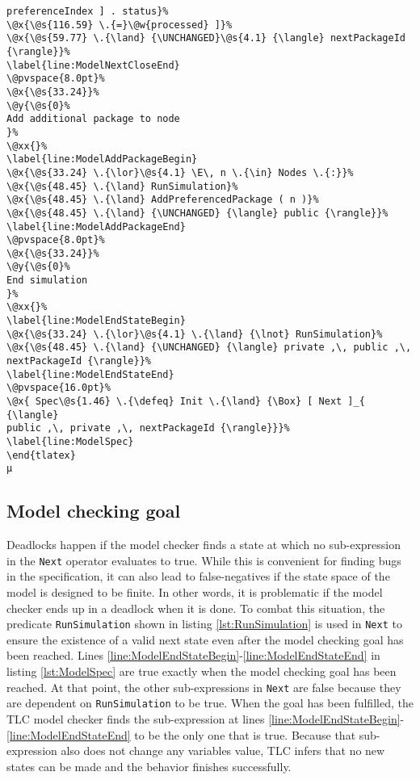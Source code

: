 \begin{lstlisting}[caption=System actor behavior in TLA\textsuperscript+ specification
    , label=lst:ModelSpec]
preferenceIndex ] . status}%
\@x{\@s{116.59} \.{=}\@w{processed} ]}%
\@x{\@s{59.77} \.{\land} {\UNCHANGED}\@s{4.1} {\langle} nextPackageId
{\rangle}}%
\label{line:ModelNextCloseEnd}
\@pvspace{8.0pt}%
\@x{\@s{33.24}}%
\@y{\@s{0}%
Add additional package to node
}%
\@xx{}%
\label{line:ModelAddPackageBegin}
\@x{\@s{33.24} \.{\lor}\@s{4.1} \E\, n \.{\in} Nodes \.{:}}%
\@x{\@s{48.45} \.{\land} RunSimulation}%
\@x{\@s{48.45} \.{\land} AddPreferencedPackage ( n )}%
\@x{\@s{48.45} \.{\land} {\UNCHANGED} {\langle} public {\rangle}}%
\label{line:ModelAddPackageEnd}
\@pvspace{8.0pt}%
\@x{\@s{33.24}}%
\@y{\@s{0}%
End simulation
}%
\@xx{}%
\label{line:ModelEndStateBegin}
\@x{\@s{33.24} \.{\lor}\@s{4.1} \.{\land} {\lnot} RunSimulation}%
\@x{\@s{48.45} \.{\land} {\UNCHANGED} {\langle} private ,\, public ,\,
nextPackageId {\rangle}}%
\label{line:ModelEndStateEnd}
\@pvspace{16.0pt}%
\@x{ Spec\@s{1.46} \.{\defeq} Init \.{\land} {\Box} [ Next ]_{ {\langle}
public ,\, private ,\, nextPackageId {\rangle}}}%
\label{line:ModelSpec}
\end{tlatex}
µ
\end{lstlisting}

\subsection{Model checking goal}
\label{subsec:ModelCheckingGoal}

Deadlocks happen if the model checker finds a state at which no sub-expression in the \texttt{Next} operator evaluates to true. While this is convenient for finding bugs in the specification, it can also lead to false-negatives if the state space of the model is designed to be finite. In other words, it is problematic if the model checker ends up in a deadlock when it is done. To combat this situation, the predicate \texttt{RunSimulation} shown in listing \ref{lst:RunSimulation} is used in \texttt{Next} to ensure the existence of a valid next state even after the model checking goal has been reached. Lines \ref{line:ModelEndStateBegin}-\ref{line:ModelEndStateEnd} in listing \ref{lst:ModelSpec} are true exactly when the model checking goal has been reached. At that point, the other sub-expressions in \texttt{Next} are false because they are dependent on \texttt{RunSimulation} to be true. When the goal has been fulfilled, the TLC model checker finds the sub-expression at lines \ref{line:ModelEndStateBegin}-\ref{line:ModelEndStateEnd} to be the only one that is true. Because that sub-expression also does not change any variables value, TLC infers that no new states can be made and the behavior finishes successfully.

